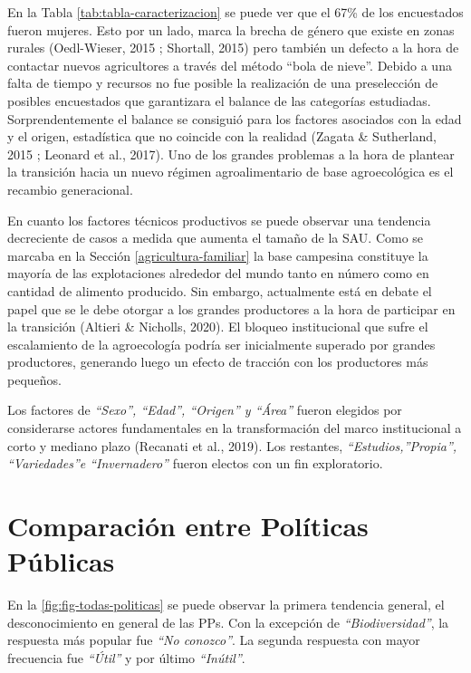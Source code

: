 \documentclass[a4paper, nobind]{templates/ociamthesis}
\begin{document}
En la Tabla \ref{tab:tabla-caracterizacion} se puede ver que el 67\% de los encuestados fueron mujeres.
Esto por un lado, marca la brecha de género que existe en zonas rurales (Oedl-Wieser, 2015 ; Shortall, 2015) pero también un defecto a la hora de contactar nuevos agricultores a través del método ``bola de nieve''.
Debido a una falta de tiempo y recursos no fue posible la realización de una preselección de posibles encuestados que garantizara el balance de las categorías estudiadas.
Sorprendentemente el balance se consiguió para los factores asociados con la edad y el origen, estadística que no coincide con la realidad (Zagata \& Sutherland, 2015 ; Leonard et al., 2017).
Uno de los grandes problemas a la hora de plantear la transición hacia un nuevo régimen agroalimentario de base agroecológica es el recambio generacional.

En cuanto los factores técnicos productivos se puede observar una tendencia decreciente de casos a medida que aumenta el tamaño de la SAU.
Como se marcaba en la Sección \ref{agricultura-familiar} la base campesina constituye la mayoría de las explotaciones alrededor del mundo tanto en número como en cantidad de alimento producido.
Sin embargo, actualmente está en debate el papel que se le debe otorgar a los grandes productores a la hora de participar en la transición (Altieri \& Nicholls, 2020).
El bloqueo institucional que sufre el escalamiento de la agroecología podría ser inicialmente superado por grandes productores, generando luego un efecto de tracción con los productores más pequeños.

Los factores de \emph{``Sexo'', ``Edad'', ``Origen'' y ``Área''} fueron elegidos por considerarse actores fundamentales en la transformación del marco institucional a corto y mediano plazo (Recanati et al., 2019).
Los restantes, \emph{``Estudios,''Propia'', ``Variedades''e ``Invernadero''} fueron electos con un fin exploratorio.

\hypertarget{PPvsPP}{%
\section{Comparación entre Políticas Públicas}\label{PPvsPP}}

En la \ref{fig:fig-todas-politicas} se puede observar la primera tendencia general, el desconocimiento en general de las PPs.
Con la excepción de \emph{``Biodiversidad''}, la respuesta más popular fue \emph{``No conozco''}.
La segunda respuesta con mayor frecuencia fue \emph{``Útil''} y por último \emph{``Inútil''}.
\end{document}
